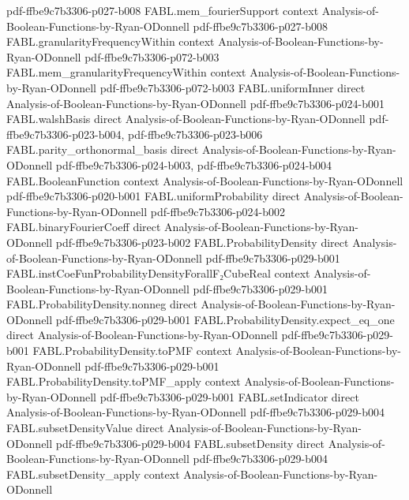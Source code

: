 \begin{theorem}
{    pdf-ffbe9c7b3306-p027-b008}
\proofstep
  {FABL.mem_fourierSupport}
  {context}
  {Analysis-of-Boolean-Functions-by-Ryan-ODonnell}
  {pdf-ffbe9c7b3306-p027-b008}
\proofstep
  {FABL.granularityFrequencyWithin}
  {context}
  {Analysis-of-Boolean-Functions-by-Ryan-ODonnell}
  {pdf-ffbe9c7b3306-p072-b003}
\proofstep
  {FABL.mem_granularityFrequencyWithin}
  {context}
  {Analysis-of-Boolean-Functions-by-Ryan-ODonnell}
  {pdf-ffbe9c7b3306-p072-b003}
\proofstep
  {FABL.uniformInner}
  {direct}
  {Analysis-of-Boolean-Functions-by-Ryan-ODonnell}
  {pdf-ffbe9c7b3306-p024-b001}
\proofstep
  {FABL.walshBasis}
  {direct}
  {Analysis-of-Boolean-Functions-by-Ryan-ODonnell}
  {pdf-ffbe9c7b3306-p023-b004,
    pdf-ffbe9c7b3306-p023-b006}
\proofstep
  {FABL.parity_orthonormal_basis}
  {direct}
  {Analysis-of-Boolean-Functions-by-Ryan-ODonnell}
  {pdf-ffbe9c7b3306-p024-b003,
    pdf-ffbe9c7b3306-p024-b004}
\proofstep
  {FABL.BooleanFunction}
  {context}
  {Analysis-of-Boolean-Functions-by-Ryan-ODonnell}
  {pdf-ffbe9c7b3306-p020-b001}
\proofstep
  {FABL.uniformProbability}
  {direct}
  {Analysis-of-Boolean-Functions-by-Ryan-ODonnell}
  {pdf-ffbe9c7b3306-p024-b002}
\proofstep
  {FABL.binaryFourierCoeff}
  {direct}
  {Analysis-of-Boolean-Functions-by-Ryan-ODonnell}
  {pdf-ffbe9c7b3306-p023-b002}
\proofstep
  {FABL.ProbabilityDensity}
  {direct}
  {Analysis-of-Boolean-Functions-by-Ryan-ODonnell}
  {pdf-ffbe9c7b3306-p029-b001}
\proofstep
  {FABL.instCoeFunProbabilityDensityForallF₂CubeReal}
  {context}
  {Analysis-of-Boolean-Functions-by-Ryan-ODonnell}
  {pdf-ffbe9c7b3306-p029-b001}
\proofstep
  {FABL.ProbabilityDensity.nonneg}
  {direct}
  {Analysis-of-Boolean-Functions-by-Ryan-ODonnell}
  {pdf-ffbe9c7b3306-p029-b001}
\proofstep
  {FABL.ProbabilityDensity.expect_eq_one}
  {direct}
  {Analysis-of-Boolean-Functions-by-Ryan-ODonnell}
  {pdf-ffbe9c7b3306-p029-b001}
\proofstep
  {FABL.ProbabilityDensity.toPMF}
  {context}
  {Analysis-of-Boolean-Functions-by-Ryan-ODonnell}
  {pdf-ffbe9c7b3306-p029-b001}
\proofstep
  {FABL.ProbabilityDensity.toPMF_apply}
  {context}
  {Analysis-of-Boolean-Functions-by-Ryan-ODonnell}
  {pdf-ffbe9c7b3306-p029-b001}
\proofstep
  {FABL.setIndicator}
  {direct}
  {Analysis-of-Boolean-Functions-by-Ryan-ODonnell}
  {pdf-ffbe9c7b3306-p029-b004}
\proofstep
  {FABL.subsetDensityValue}
  {direct}
  {Analysis-of-Boolean-Functions-by-Ryan-ODonnell}
  {pdf-ffbe9c7b3306-p029-b004}
\proofstep
  {FABL.subsetDensity}
  {direct}
  {Analysis-of-Boolean-Functions-by-Ryan-ODonnell}
  {pdf-ffbe9c7b3306-p029-b004}
\proofstep
  {FABL.subsetDensity_apply}
  {context}
  {Analysis-of-Boolean-Functions-by-Ryan-ODonnell}

\end{theorem}
